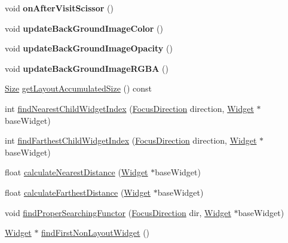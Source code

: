 \begin{DoxyCompactItemize}
\item 
\mbox{\label{classui_1_1Layout_a45958ebbb2bf7b40f111ff4bc886c770}} 
void {\bfseries on\+After\+Visit\+Scissor} ()
\item 
\mbox{\label{classui_1_1Layout_a58c1f81d4aab6ee26b753ed8419cb810}} 
void {\bfseries update\+Back\+Ground\+Image\+Color} ()
\item 
\mbox{\label{classui_1_1Layout_a2661d032e11a45d70ac33c00d70b010c}} 
void {\bfseries update\+Back\+Ground\+Image\+Opacity} ()
\item 
\mbox{\label{classui_1_1Layout_ac52d74ef9c7a8980620ca54cc9e4dd55}} 
void {\bfseries update\+Back\+Ground\+Image\+R\+G\+BA} ()
\item 
\hyperlink{classSize}{Size} \hyperlink{classui_1_1Layout_ae56f064b4fa0475a5caa6dc325d7bf73}{get\+Layout\+Accumulated\+Size} () const
\item 
int \hyperlink{classui_1_1Layout_a522d31325af855e6a5a7ed38f1878a9b}{find\+Nearest\+Child\+Widget\+Index} (\hyperlink{classui_1_1Widget_a8ae8e8fc793a04a87584205cd1e8a8a5}{Focus\+Direction} direction, \hyperlink{classui_1_1Widget}{Widget} $\ast$base\+Widget)
\item 
int \hyperlink{classui_1_1Layout_aa40ce38ab200edba57e704834b395a4a}{find\+Farthest\+Child\+Widget\+Index} (\hyperlink{classui_1_1Widget_a8ae8e8fc793a04a87584205cd1e8a8a5}{Focus\+Direction} direction, \hyperlink{classui_1_1Widget}{Widget} $\ast$base\+Widget)
\item 
float \hyperlink{classui_1_1Layout_a2f584f68c1cb52969140e28af913005b}{calculate\+Nearest\+Distance} (\hyperlink{classui_1_1Widget}{Widget} $\ast$base\+Widget)
\item 
float \hyperlink{classui_1_1Layout_a57187bccc77bc2ca377817bb1a1a15a1}{calculate\+Farthest\+Distance} (\hyperlink{classui_1_1Widget}{Widget} $\ast$base\+Widget)
\item 
void \hyperlink{classui_1_1Layout_a9b6137410a64eff4c2a630aa7d2a703f}{find\+Proper\+Searching\+Functor} (\hyperlink{classui_1_1Widget_a8ae8e8fc793a04a87584205cd1e8a8a5}{Focus\+Direction} dir, \hyperlink{classui_1_1Widget}{Widget} $\ast$base\+Widget)
\item 
\hyperlink{classui_1_1Widget}{Widget} $\ast$ \hyperlink{classui_1_1Layout_a52c6be4e80293093f99f870f3d303263}{find\+First\+Non\+Layout\+Widget} ()

\end{DoxyCompactItemize}
